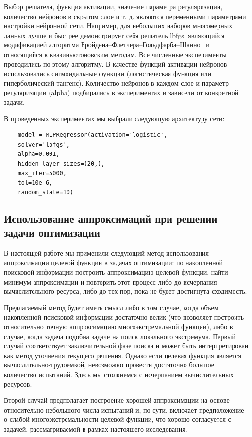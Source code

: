 \documentclass[mathematics,article,accept,pdftex,moreauthors]{Definitions/mdpi}
\begin{document}
Выбор решателя, функция активации, значение параметра регуляризации, количество нейронов в скрытом слое и т. д. являются переменными параметрами настройки нейронной сети.
Например, для небольших наборов многомерных данных лучше и быстрее демонстрирует себя решатель lbfgs, являющийся модификацией алгоритма Бройдена--Флетчера--Гольдфарба--Шанно~\cite{Nocedal2006} и относящийся к квазиньютоновским методам. Все численные эксперименты проводились по этому алгоритму.
В качестве функций активации нейронов использовались сигмоидальные функции (логистическая функция или гиперболический тангенс).
Количество нейронов в каждом слое и параметр регуляризации (alpha) подбирались в экспериментах и зависели от конкретной задачи.

В проведенных экспериментах мы выбрали следующую архитектуру сети:

\begin{verbatim}
    model = MLPRegressor(activation='logistic',
	solver='lbfgs',
	alpha=0.001,
	hidden_layer_sizes=(20,),
	max_iter=5000,
	tol=10e-6,
	random_state=10)
\end{verbatim}


\subsection{Использование аппроксимаций при решении задачи оптимизации}\label{GSA_Appr}

В настоящей работе мы применили следующий метод использования аппроксимации целевой функции в задачах оптимизации: по накопленной поисковой информации построить аппроксимацию целевой функции, найти минимум аппроксимации и повторить этот процесс либо до исчерпания вычислительного ресурса, либо до тех пор, пока не будет достигнута сходимость.

Предлагаемый метод будет иметь смысл либо в том случае, когда объем накопленной поисковой информации достаточно велик (что позволяет построить относительно точную аппроксимацию многоэкстремальной функции), либо в случае, когда задача подобна задаче на поиск локального экстремума.
Первый случай соответствует заключительной фазе поиска и может быть интерпретирован как метод уточнения текущего решения. Однако если целевая функция является вычислительно-трудоемкой, невозможно провести достаточно большое количество испытаний. Здесь мы столкнемся с исчерпанием вычислительных ресурсов.

Второй случай предполагает построение хорошей аппроксимации на основе относительно небольшого числа испытаний и, по сути, включает предположение о слабой многоэкстремальности целевой функции, что хорошо согласуется с задачей, рассматриваемой в рамках настоящего исследования.
\end{document}
